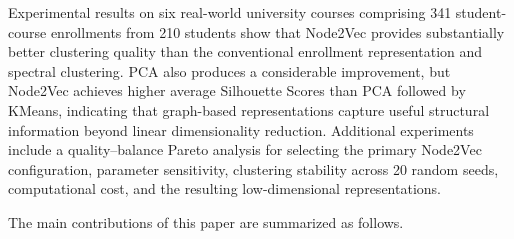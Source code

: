 \documentclass[pdflatex,sn-mathphys-num,iicol]{sn-jnl}%
\theoremstyle{thmstyleone}%
\theoremstyle{thmstyletwo}%
\theoremstyle{thmstylethree}%
\begin{document}
Experimental results on six real-world university courses comprising 341 student-course enrollments from 210 students show that Node2Vec provides substantially better clustering quality than the conventional enrollment representation and spectral clustering. PCA also produces a considerable improvement, but Node2Vec achieves higher average Silhouette Scores than PCA followed by KMeans, indicating that graph-based representations capture useful structural information beyond linear dimensionality reduction. Additional experiments include a quality--balance Pareto analysis for selecting the primary Node2Vec configuration, parameter sensitivity, clustering stability across 20 random seeds, computational cost, and the resulting low-dimensional representations.

The main contributions of this paper are summarized as follows.
\end{document}
